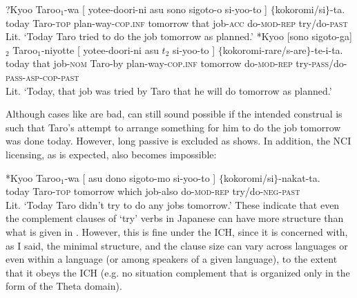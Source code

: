 \documentclass[output=paper]{langsci/langscibook}
\begin{document}
\ea\label{shimamu34} 
\begin{xlist} 
\ex\label{shimamu34a} \hspace{-1.5mm}?{\gll Kyoo Taroo$_1$-wa [  yotee-doori-ni asu sono sigoto-o si-yoo-to ] $\{$kokoromi/si$\}$-ta.\\
today Taro-\textsc{top} {} plan-way-\textsc{cop.inf} tomorrow that job-\textsc{acc} do-\textsc{mod-rep} {} \phantom{$\{$}try/do-\textsc{past}\\
\glt Lit. `Today Taro tried to do the job tomorrow as planned.'}
\ex\label{shimamu34b} \hspace{-1.5mm}*{\gll Kyoo [sono sigoto-ga]$_2$ Taroo$_1$-niyotte [  yotee-doori-ni asu $t_2$ si-yoo-to ] $\{$kokoromi-rare/s-are$\}$-te-i-ta.\\
 today \phantom{[}that job-\textsc{nom} Taro-by {} plan-way-\textsc{cop.inf} tomorrow {} do-\textsc{mod-rep} {} \phantom{$\{$}try-\textsc{pass}/do-\textsc{pass}-\textsc{asp-cop-past}\\
\glt Lit. `Today, that job was tried by Taro that he will do tomorrow as planned.'}
\end{xlist}
\z
Although cases like  are bad,  can still sound possible if the intended construal is such that Taro's attempt to arrange something for him to do the job tomorrow was done today. However, long passive is excluded as  shows. In addition, the NCI licensing, as is expected, also becomes impossible:

\ea\label{shimamu35} \hspace{-1.5mm}*{\gll Kyoo Taroo$_1$-wa [  asu dono sigoto-mo si-yoo-to ] $\{$kokoromi/si$\}$-nakat-ta.\\
today Taro-\textsc{top} {} tomorrow which job-also do-\textsc{mod-rep} {} \phantom{$\{$}try/do-\textsc{neg-past}\\
\glt Lit. `Today Taro didn't try to do any jobs tomorrow.'}
\z
These indicate that even the complement clauses of `try' verbs in Japanese can have more structure than what is given in . However, this is fine under the ICH, since it is concerned with, as I said, the minimal structure, and the clause size can vary across languages or even within a language (or among speakers of a given language), to the extent that it obeys the ICH (e.g. no situation complement that is organized only in the form of the Theta domain).
\end{document}
